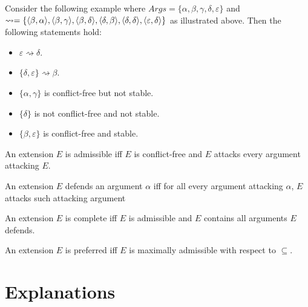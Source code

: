 Consider the following example where $Args=\{\alpha,\beta,\gamma,\delta,\varepsilon\}$ and $	\rightsquigarrow=\{
\langle{\beta},{\alpha}\rangle,\\
\langle{\beta},{\gamma}\rangle,
\langle{\beta},{\delta}\rangle,
\langle{\delta},{\beta}\rangle,
\langle{\delta},{\delta}\rangle,
\langle{\varepsilon},{\delta}\rangle
\}$ as illustrated above. Then the following statements hold:
\begin{itemize}
	\item $\varepsilon\rightsquigarrow\delta$.
	\item $\{\delta,\varepsilon\}\rightsquigarrow\beta$.
	\item $\{\alpha,\gamma\}$ is conflict-free but not stable.
	\item $\{\delta\}$ is not conflict-free and not stable.
	\item $\{\beta,\varepsilon\}$ is conflict-free and stable.
\end{itemize}

\begin{definition}
	An extension $E$ is admissible iff $E$ is conflict-free and $E$ attacks every argument attacking $E$.
\end{definition}

\begin{definition}
	An extension $E$ defends an argument $\alpha$ iff for all every argument attacking $\alpha$, $E$ attacks such attacking argument 
\end{definition}

\begin{definition}
	An extension $E$ is complete iff $E$ is admissible and $E$ contains all arguments $E$ defends.
\end{definition}

\begin{definition}
	An extension $E$ is preferred iff $E$ is maximally admissible with respect to $\subseteq$.
\end{definition}

\section{Explanations}

